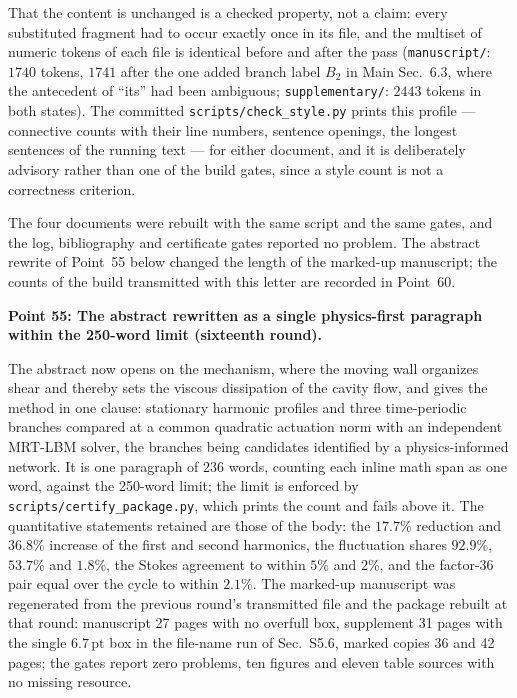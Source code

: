 \documentclass[11pt,a4paper]{article}
\newcommand{\brk}{\hspace{0pt}}
\begin{document}
That the content is unchanged is a checked property, not a claim: every substituted
fragment had to occur exactly once in its file, and the multiset of numeric tokens of
each file is identical before and after the pass (\texttt{manuscript/}: \(1740\)
tokens, \(1741\) after the one added branch label \(B_2\) in Main Sec.~6.3, where the
antecedent of ``its'' had been ambiguous; \texttt{supplementary/}: \(2443\) tokens in
both states). The committed \texttt{scripts/}\brk\texttt{check\_style.py} prints this
profile --- connective counts with their line numbers, sentence openings, the longest
sentences of the running text --- for either document, and it is deliberately advisory
rather than one of the build gates, since a style count is not a correctness criterion.

The four documents were rebuilt with the same script and the same gates, and the
log, bibliography and certificate gates reported no problem. The abstract rewrite
of Point~55 below changed the length of the marked-up manuscript; the counts of
the build transmitted with this letter are recorded in Point~60.

\vspace{1em}

\noindent\textbf{Point 55: The abstract rewritten as a single physics-first
paragraph within the 250-word limit (sixteenth round).}

The abstract now opens on the mechanism, where the moving wall organizes shear
and thereby sets the viscous dissipation of the cavity flow, and gives the method
in one clause: stationary harmonic profiles and three time-periodic branches
compared at a common quadratic actuation norm with an independent MRT-LBM solver,
the branches being candidates identified by a physics-informed network. It is one
paragraph of 236 words, counting each inline math span as one word, against the
250-word limit; the limit is enforced by
\texttt{scripts/}\hspace{0pt}\texttt{certify\_package.py}, which prints the count
and fails above it. The quantitative statements retained are those of the body:
the $17.7\%$ reduction and $36.8\%$ increase of the first and second harmonics,
the fluctuation shares $92.9\%$, $53.7\%$ and $1.8\%$, the Stokes agreement to
within $5\%$ and $2\%$, and the factor-$36$ pair equal over the cycle to within
$2.1\%$. The marked-up manuscript was regenerated from the previous round's
transmitted file and the package rebuilt at that round: manuscript 27 pages with no overfull
box, supplement 31 pages with the single \(6.7\,\mathrm{pt}\) box in the file-name
run of Sec.~S5.6, marked copies 36 and 42 pages; the gates report zero problems,
ten figures and eleven table sources with no missing resource.
\end{document}
